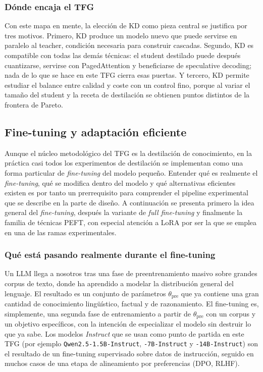 \documentclass[11pt,a4paper]{article}
\begin{document}
\subsubsection{Dónde encaja el TFG}

Con este mapa en mente, la elección de KD como pieza central se justifica por tres motivos. Primero, KD produce un modelo nuevo que puede servirse en paralelo al teacher, condición necesaria para construir cascadas. Segundo, KD es compatible con todas las demás técnicas: el student destilado puede después cuantizarse, servirse con PagedAttention y beneficiarse de speculative decoding; nada de lo que se hace en este TFG cierra esas puertas. Y tercero, KD permite estudiar el balance entre calidad y coste con un control fino, porque al variar el tamaño del student y la receta de destilación se obtienen puntos distintos de la frontera de Pareto.

\subsection{Fine-tuning y adaptación eficiente}

Aunque el núcleo metodológico del TFG es la destilación de conocimiento, en la práctica casi todos los experimentos de destilación se implementan como una forma particular de \textit{fine-tuning} del modelo pequeño. Entender qué es realmente el \textit{fine-tuning}, qué se modifica dentro del modelo y qué alternativas eficientes existen es por tanto un prerrequisito para comprender el pipeline experimental que se describe en la parte de diseño. A continuación se presenta primero la idea general del \textit{fine-tuning}, después la variante de \textit{full fine-tuning} y finalmente la familia de técnicas PEFT, con especial atención a LoRA por ser la que se emplea en una de las ramas experimentales.

\subsubsection{Qué está pasando realmente durante el fine-tuning}

Un LLM llega a nosotros tras una fase de preentrenamiento masivo sobre grandes corpus de texto, donde ha aprendido a modelar la distribución general del lenguaje. El resultado es un conjunto de parámetros $\theta_{\text{pre}}$ que ya contiene una gran cantidad de conocimiento lingüístico, factual y de razonamiento. El fine-tuning es, simplemente, una segunda fase de entrenamiento a partir de $\theta_{\text{pre}}$ con un corpus y un objetivo específicos, con la intención de especializar el modelo sin destruir lo que ya sabe. Los modelos \textit{Instruct} que se usan como punto de partida en este TFG (por ejemplo \texttt{Qwen2.5-1.5B-Instruct}, \texttt{-7B-Instruct} y \texttt{-14B-Instruct}) son el resultado de un fine-tuning supervisado sobre datos de instrucción, seguido en muchos casos de una etapa de alineamiento por preferencias (DPO, RLHF).
\end{document}

